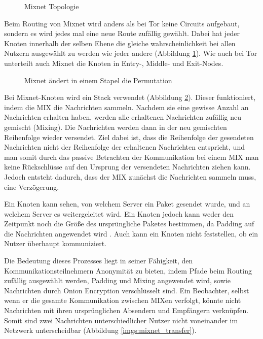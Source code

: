 \begin{figure}[h!]
    \centering
    
    \caption{Mixnet Topologie}
    \label{imgs:mixnet}
\end{figure}

Beim Routing von Mixnet wird anders als bei Tor keine Circuits aufgebaut, sondern es wird jedes mal eine neue Route zufällig gewählt. Dabei hat jeder Knoten innerhalb der selben Ebene die gleiche wahrscheinlichkeit bei allen Nutzern ausgewählt zu werden wie jeder andere (Abbildung \ref{imgs:mixnet}). Wie auch bei Tor unterteilt auch Mixnet die Knoten in Entry-, Middle- und Exit-Nodes.

\begin{figure}[h!]
    \centering
    
    \caption{Mixnet ändert in einem Stapel die Permutation}
    \label{imgs:mixnet_stack}
\end{figure}

Bei Mixnet-Knoten wird ein Stack verwendet (Abbildung \ref{imgs:mixnet_stack}). Dieser funktioniert, indem die MIX die Nachrichten sammeln. Nachdem sie eine gewisse Anzahl an Nachrichten erhalten haben, werden alle erhaltenen Nachrichten zufällig neu gemischt (Mixing). Die Nachrichten werden dann in der neu gemischten Reihenfolge wieder versendet. Ziel dabei ist, dass die Reihenfolge der gesendeten Nachrichten nicht der Reihenfolge der erhaltenen Nachrichten entspricht, und man somit durch das passive Betrachten der Kommunikation bei einem MIX man keine Rückschlüsse auf den Ursprung der versendeten Nachrichten ziehen kann. Jedoch entsteht dadurch, dass der MIX zunächst die Nachrichten sammeln muss, eine Verzögerung.

Ein Knoten kann sehen, von welchem Server ein Paket gesendet wurde, und an welchem Server es weitergeleitet wird. Ein Knoten jedoch kann weder den Zeitpunkt noch die Größe des ursprüngliche Paketes bestimmen, da Padding auf die Nachrichten angewendet wird . Auch kann ein Knoten nicht feststellen, ob ein Nutzer überhaupt kommuniziert.

Die Bedeutung dieses Prozesses liegt in seiner Fähigkeit, den Kommunikationsteilnehmern Anonymität zu bieten, indem Pfade beim Routing zufällig ausgewählt werden, Padding und Mixing angewendet wird, sowie Nachrichten durch Onion Encryption verschlüsselt sind. Ein Beobachter, selbst wenn er die gesamte Kommunikation zwischen MIXen verfolgt, könnte nicht Nachrichten mit ihren ursprünglichen Absendern und Empfängern verknüpfen. Somit sind zwei Nachrichten unterschiedlicher Nutzer nicht voneinander im Netzwerk unterscheidbar (Abbildung \ref{imgs:mixnet_transfer}).

